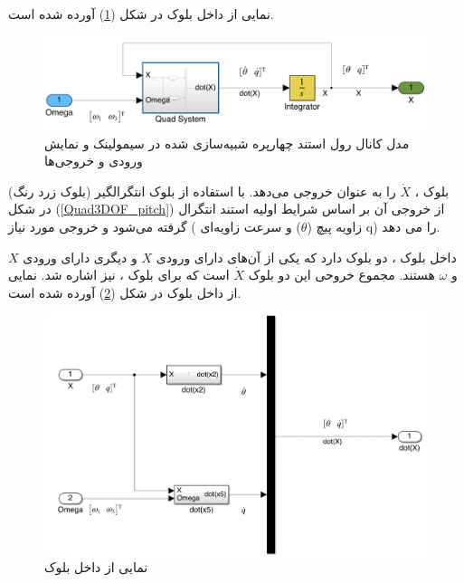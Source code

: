 نمایی از داخل بلوک
در شکل (\ref{Quad1DOF_pitch}) آورده شده است.
\begin{figure}[H]
	\includegraphics[width=16cm]{../Figures/QuadSimulation/pitch_Integrator.png}
	\centering
	\vspace*{-15mm}
	\caption{مدل کانال رول استند چهارپره شبیه‌سازی شده در سیمولینک و نمایش ورودی و خروجی‌ها}
	\label{Quad1DOF_pitch}
\end{figure}
بلوک
،
$\dot X$ را به عنوان خروجی می‌دهد. با استفاده از بلوک انتگرالگیر (بلوک زرد رنگ) در شکل
(\ref{Quad3DOF_pitch})
از خروجی آن بر اساس شرایط اولیه استند انتگرال گرفته می‌شود و خروجی مورد نیاز ( زاویه پیچ ($\theta$) و سرعت زاویه‌ای‌
q)
را می دهد.

داخل بلوک
،
دو بلوک دارد که یکی از آن‌های دارای ورودی $X$ و دیگری دارای ورودی $X$ و $\omega$ هستند. مجموع خروحی این دو بلوک $\dot X$ است که برای بلوک
،
نیز اشاره شد.
نمایی از داخل بلوک
در شکل (\ref{pitch_all-six}) آورده شده است.
\begin{figure}[H]
	\includegraphics[width=16cm]{../Figures/QuadSimulation/pitch_all-six.png}
	\centering
	\caption{نمایی از داخل بلوک }
	\label{pitch_all-six}
\end{figure}

